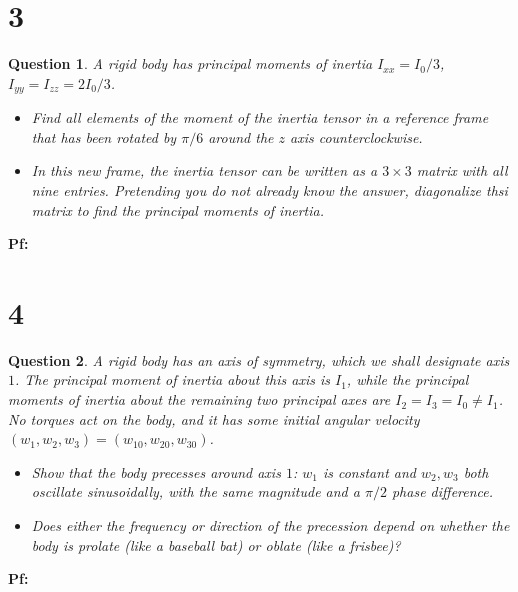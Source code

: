 \documentclass{article}
\newtheorem{question}{Question}
\begin{document}
\section*{3}
\begin{question}\label{q3}
    A rigid body has principal moments of inertia $I_{xx}=I_0/3$, $I_{yy}=I_{zz}=2I_0/3$.
    \begin{itemize}
        \item[(a)] Find all elements of the moment of the inertia tensor in a reference frame that has been rotated by $\pi/6$ around the $z$ axis counterclockwise.
        \item[(b)] In this new frame, the inertia tensor can be written as a $3\times 3$ matrix with all nine entries. Pretending you do not already know the answer, diagonalize thsi matrix to find the principal moments of inertia. 
    \end{itemize}
\end{question}

\textbf{Pf:}

\break

\section*{4}
\begin{question}\label{q4}
    A rigid body has an axis of symmetry, which we shall designate axis $1$. The principal moment of inertia about this axis is $I_1$, while the principal moments of inertia about the remaining two principal axes are $I_2=I_3=I_0\neq I_1$. No torques act on the body, and it has some initial angular velocity $(w_1,w_2,w_3)=(w_{10},w_{20},w_{30})$.
    \begin{itemize}
        \item[(a)] Show that the body precesses around axis $1$: $w_1$ is constant and $w_2,w_3$ both oscillate sinusoidally, with the same magnitude and a $\pi/2$ phase difference.
        \item[(b)] Does either the frequency or direction of the precession depend on whether the body is prolate (like a baseball bat) or oblate (like a frisbee)? 
    \end{itemize}
\end{question}

\textbf{Pf:}

\break
\end{document}
